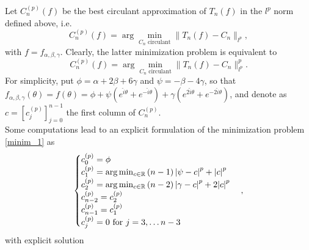 \documentclass{article}
\def\R{{\mathbb{R}}}
\begin{document}
Let $ C_{ n }^{ \left( p \right) }(f) $ be the best circulant approximation of $ T_{ n } \left( f \right) $ in the $ l^{ p } $ norm defined above, i.e.
\begin{equation*}
	C_{ n }^{ \left( p \right) }(f) = \arg \min_{ C_{ n } \text{ circulant} } \| T_{ n } \left( f \right) - C_{ n } \|_{ l^{ p } },
\end{equation*}
with $f=f_{ \alpha, \beta, \gamma }$.
Clearly, the latter minimization problem is equivalent to
\begin{equation} \label{minim_1}
	C_{ n }^{ \left( p \right) }(f) = \arg \min_{ C_{ n } \text{ circulant} } \| T_{ n } \left( f \right) - C_{ n } \|_{ l^{ p } }^{ p }.
\end{equation}
For simplicity, put $ \phi = \alpha + 2 \beta + 6 \gamma $ and $ \psi = - \beta - 4 \gamma $, so that $ f_{ \alpha, \beta, \gamma } \left( \theta \right) = f \left( \theta \right) = \phi + \psi \left( e^{ \hat i \theta } + e^{ - \hat i \theta } \right) + \gamma \left( e^{ 2 \hat i \theta } + e^{ - 2 \hat i \theta } \right) $, and denote as $ c = \left[ c_{ j }^{ \left( p \right) } \right]_{ j = 0 }^{ n - 1 } $ the first column of $ C_{ n }^{ \left( p \right) } $. \\
Some computations lead to an explicit formulation of the minimization problem \eqref{minim_1} as
\begin{equation*}
	\begin{cases}
		c_{ 0 }^{ \left( p \right) } = \phi \\
		c_{ 1 }^{ \left( p \right) } = \arg \min_{ c \in \R } \left( n - 1 \right) \abs{ \psi - c }^{ p } + \abs{ c }^{ p } \\
		c_{ 2 }^{ \left( p \right) } = \arg \min_{ c \in \R } \left( n - 2 \right) \abs{ \gamma - c }^{ p } + 2 \abs{ c }^{ p } \\
		c_{ n - 2 }^{ \left( p \right) } = c_{ 2 }^{ \left( p \right) } \\
		c_{ n - 1 }^{ \left( p \right) } = c_{ 1 }^{ \left( p \right) } \\
		c_{ j }^{ \left( p \right) } = 0 \text{ for } j = 3, \dots n - 3
	\end{cases},
\end{equation*}
with explicit solution
\end{document}
